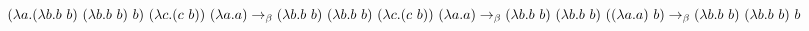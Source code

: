 \documentclass{article}
\begin{document}
\noindent
$\noindent (\lambda a.(\lambda b.b\ b)\ (\lambda b.b\ b)\ b)\ (\lambda c.(c\ b))\ (\lambda a.a) \to _\beta \\
(\lambda b.b\ b)\ (\lambda b.b\ b)\ (\lambda c.(c\ b))\ (\lambda a.a) \to _\beta \\
(\lambda b.b\ b)\ (\lambda b.b\ b)\ ((\lambda a.a)\ b) \to _\beta \\
(\lambda b.b\ b)\ (\lambda b.b\ b)\ b$
\end{document}
